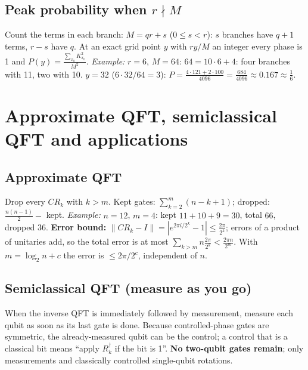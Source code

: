 \documentclass[11pt,a4paper,openany]{book}
\begin{document}
\subsection{Peak probability when $r \nmid M$}
Count the terms in each branch: $M = qr + s$ ($0 \le s < r$): $s$ branches have $q + 1$ terms, $r - s$ have $q$.
At an exact grid point $y$ with $ry/M$ an integer every phase is 1 and $P(y) = \frac{\sum_{x_0}K_{x_0}^2}{M^2}$.
\emph{Example:} $r = 6$, $M = 64$: $64 = 10\cdot 6 + 4$: four branches with 11, two with 10. $y = 32$ ($6\cdot 32/64 = 3$):
$P = \frac{4\cdot121 + 2\cdot100}{4096} = \frac{684}{4096} \approx 0.167 \approx \frac16$.

\section{Approximate QFT, semiclassical QFT and applications}
\subsection{Approximate QFT}
Drop every $CR_k$ with $k > m$. Kept gates: $\sum_{k=2}^{m}(n - k + 1)$; dropped: $\frac{n(n-1)}{2} - $ kept.
\emph{Example:} $n = 12$, $m = 4$: kept $11 + 10 + 9 = 30$, total $66$, dropped $36$.
\textbf{Error bound:} $\|CR_k - I\| = |e^{2\pi i/2^k} - 1| \le \frac{2\pi}{2^k}$; errors of a product of unitaries add, so the total error is at
most $\sum_{k > m} n\frac{2\pi}{2^k} < \frac{2\pi n}{2^m}$. With $m = \log_2 n + c$ the error is $\le 2\pi/2^c$, independent of $n$.

\subsection{Semiclassical QFT (measure as you go)}
When the inverse QFT is immediately followed by measurement, measure each qubit as soon as its last gate is done.
Because controlled-phase gates are symmetric, the already-measured qubit can be the control; a control that is a
classical bit means ``apply $R_k^\dagger$ if the bit is 1''. \textbf{No two-qubit gates remain}; only measurements and
classically controlled single-qubit rotations.
\end{document}
